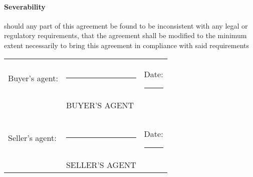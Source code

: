 \documentclass[10pt]{article}
\begin{document}
\paragraph{Severability} should any part of this agreement be found to be inconsistent with any legal or regulatory requirements, that the agreement shall be modified to the minimum extent necessarily to bring this agreement in compliance with said requirements

\vspace{1cm}
\noindent \begin{tabular}{l l l}
Buyer's agent: & \rule{6cm}{.2pt} & Date: \rule{2.4cm}{.2pt}\\
                         & BUYER'S AGENT      & \\\\\\
Seller's agent:          & \rule{6cm}{.2pt} & Date: \rule{2.4cm}{.2pt}\\
                         & SELLER'S AGENT      & \\
\end{tabular}
\end{document}

